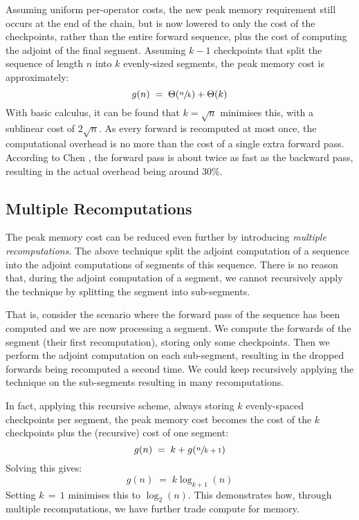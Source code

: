 Assuming uniform per-operator costs, the new peak memory requirement still occurs at the end of the chain, but is now lowered to only the cost of the checkpoints, rather than the entire forward sequence, plus the cost of computing the adjoint of the final segment.
Assuming \(k-1\) checkpoints that split the sequence of length \(n\) into \(k\) evenly-sized segments, the peak memory cost is approximately:
\begin{equation*}
    g(n) \;=\; \Theta(\sfrac{n}{k}) + \Theta(k)
\end{equation*}
With basic calculus, it can be found that \(k = \sqrt{n}\) minimises this, with a sublinear cost of \(2\sqrt{n}\).
As every forward is recomputed at most once, the computational overhead is no more than the cost of a single extra forward pass.
According to Chen \cite{Chen2016}, the forward pass is about twice as fast as the backward pass, resulting in the actual overhead being around 30\%.

\subsection{Multiple Recomputations}
The peak memory cost can be reduced even further by introducing \textit{multiple recomputations}.
The above technique split the adjoint computation of a sequence into the adjoint computations of segments of this sequence.
There is no reason that, during the adjoint computation of a segment, we cannot recursively apply the technique by splitting the segment into sub-segments.

That is, consider the scenario where the forward pass of the sequence has been computed and we are now processing a segment.
We compute the forwards of the segment (their first recomputation), storing only some checkpoints. Then we perform the adjoint computation on each sub-segment, resulting in the dropped forwards being recomputed a second time. We could keep recursively applying the technique on the sub-segments resulting in many recomputations.

In fact, applying this recursive scheme, always storing \(k\) evenly-spaced checkpoints per segment, the peak memory cost becomes the cost of the \(k\) checkpoints plus the (recursive) cost of one segment:
\begin{equation*}
    g(n) \;=\; k + g(\sfrac{n}{k+1})
\end{equation*}
Solving this gives:
\begin{equation*}
    g(n) \;=\; k\log_{k+1}(n)
\end{equation*}
Setting \(k\,=\,1\) minimises this to \(\log_2(n)\). 
This demonstrates how, through multiple recomputations, we have further trade compute for memory.

